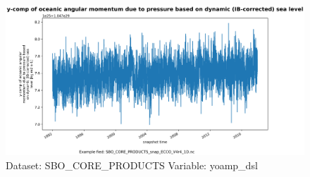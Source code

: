 \begin{figure}[H]
\centering
\includegraphics[scale=0.55]{../images/plots/oneD_plots/SBO_Core_Products/yoamp_dsl.png}
\caption{Dataset: SBO\_CORE\_PRODUCTS Variable: yoamp\_dsl}
\label{tab:table-SBO_CORE_PRODUCTS_yoamp_dsl-Plot}
\end{figure}
\pagebreak
